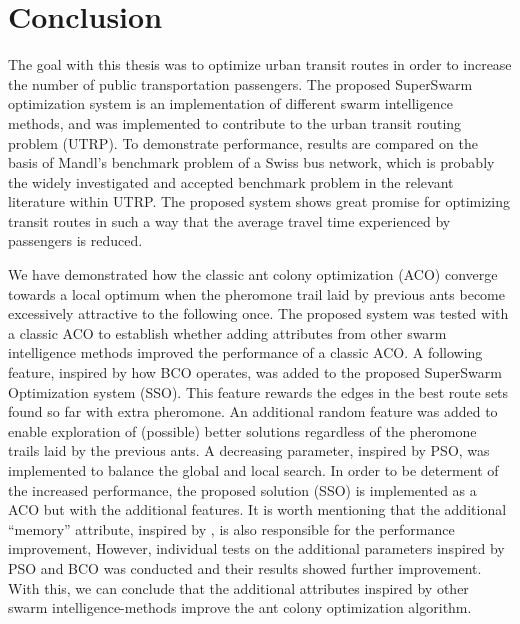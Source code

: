 \section{Conclusion}


The goal with this thesis was to optimize urban transit routes in order to increase the number of public transportation passengers. The proposed SuperSwarm optimization system is an implementation of different swarm intelligence methods, and was implemented to contribute to the urban transit routing problem (UTRP). To demonstrate performance, results are compared on the basis of Mandl's benchmark problem of a Swiss bus network, which is probably the widely investigated and accepted benchmark problem in the relevant literature within UTRP. The proposed system shows great promise for optimizing transit routes in such a way that the average travel time experienced by passengers is reduced. 
\newline

We have demonstrated how the classic ant colony optimization (ACO) converge towards a local optimum when the pheromone trail laid by previous ants become excessively attractive to the following once. The proposed system was tested with a classic ACO to establish whether adding attributes from other swarm intelligence methods improved the performance of a classic ACO. A following feature, inspired by how BCO operates, was added to the proposed SuperSwarm Optimization system (SSO). This feature rewards the edges in the best route sets found so far with extra pheromone. An additional random feature was added to enable exploration of (possible) better solutions regardless of the pheromone trails laid by the previous ants. A decreasing parameter, inspired by PSO, was implemented to balance the global and local search. In order to be determent of the increased performance, the proposed solution (SSO) is implemented as a ACO but with the additional features. It is worth mentioning that the additional ``memory'' attribute, inspired by \citet{dorigo96, sedighpour14, poorzahedy11, salehinejad10}, is also responsible for the performance improvement, However, individual tests on the additional parameters inspired by PSO and BCO was conducted and their results showed further improvement. With this, we can conclude that the additional attributes inspired by other swarm intelligence-methods improve the ant colony optimization algorithm. 
\newline

